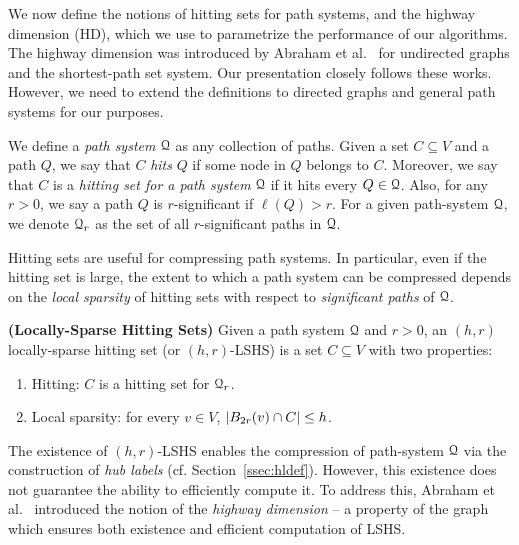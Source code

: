 
We now define the notions of hitting sets for path systems, and the highway dimension (HD), which we use to parametrize the performance of our algorithms. The highway dimension was introduced by Abraham et al.~\cite{highway2013,highway2010} for undirected graphs and the shortest-path set system. 
Our presentation closely follows these works.
However, we need to extend the definitions to directed graphs and general path systems for our purposes. 

We define a \emph{path system} $\calQ$ as any collection of paths.
Given a set $C\subseteq V$ and a path $Q$, we say that $C$ \emph{hits} $Q$ if some node in $Q$ belongs to $C$. Moreover, we say that $C$ is a \emph{hitting set for a path system} $\calQ$ if it hits every $Q\in\calQ$. Also, for any $r>0$, we say a path $Q$ is $r$-significant if $\ell(Q)>r$. 
For a given path-system $\calQ$, we denote $\calQ_r$ as the set of all $r$-significant paths in $\calQ$.

Hitting sets are useful for compressing path systems. In particular, even if the hitting set is large, the extent to which a path system can be compressed depends on the \emph{local sparsity} of hitting sets with respect to \emph{significant paths} of $\calQ$.

\begin{definition}
\label{def:lshs}
\textbf{(Locally-Sparse Hitting Sets)} Given a path system $\calQ$ and $r>0$, an $(h,r)$ locally-sparse hitting set (or $(h,r)$-LSHS) is a set $C\subseteq V$ with two properties: 
\begin{enumerate}[nosep]
\item Hitting: $C$ is a hitting set for $\calQ_r$.
\item Local sparsity: for every $v\in V$, $\abs*{B_{2r}(v)\cap C}\leq h$.
\end{enumerate}
\end{definition}


The existence of $(h,r)$-LSHS enables the compression of path-system $\calQ$ via the construction of \emph{hub labels} (cf. Section~\ref{ssec:hldef}). However, this existence does not guarantee the ability to efficiently compute it. 
To address this, Abraham et al.~\cite{highway2013} introduced the notion of the \emph{highway dimension} -- a property of the graph which ensures both existence and efficient computation of LSHS. 


